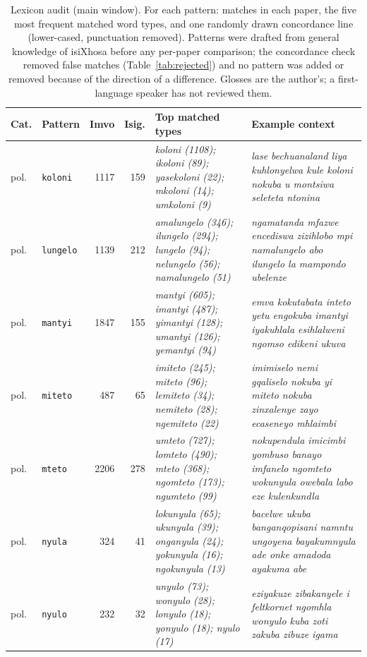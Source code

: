 \begin{table}[h]\centering\scriptsize\caption{Lexicon audit (main window). For each pattern: matches in each paper, the five most frequent matched word types, and one randomly drawn concordance line (lower-cased, punctuation removed). Patterns were drafted from general knowledge of isiXhosa before any per-paper comparison; the concordance check removed false matches (Table~\ref{tab:rejected}) and no pattern was added or removed because of the direction of a difference. Glosses are the author's; a first-language speaker has not reviewed them.}
\begin{tabular}{@{}llrrp{}p{}@{}}\toprule Cat. & Pattern & Imvo & Isig. & Top matched types & Example context \\ \midrule
pol. & \texttt{koloni} & 1117 & 159 & \emph{koloni (1108); ikoloni (89); yasekoloni (22); mkoloni (14); umkoloni (9)} & \emph{lase bechuanaland liya kuhlonyelwa kule koloni nokuba u montsiwa seleteta ntonina} \\
pol. & \texttt{lungelo} & 1139 & 212 & \emph{amalungelo (346); ilungelo (294); lungelo (94); nelungelo (56); namalungelo (51)} & \emph{ngamatanda mfazwe encediswa zizihlobo mpi namalungelo abo ilungelo la mampondo ubelenze} \\
pol. & \texttt{mantyi} & 1847 & 155 & \emph{mantyi (605); imantyi (487); yimantyi (128); umantyi (126); yemantyi (94)} & \emph{emva kokutabata inteto yetu engokuba imantyi iyakuhlala esihlalweni ngomso edikeni ukuva} \\
pol. & \texttt{miteto} & 487 & 65 & \emph{imiteto (245); miteto (96); lemiteto (34); nemiteto (28); ngemiteto (22)} & \emph{imimiselo nemi gqaliselo nokuba yi miteto nokuba zinxalenye zayo ecaseneyo mhlaimbi} \\
pol. & \texttt{mteto} & 2206 & 278 & \emph{umteto (727); lomteto (490); mteto (368); ngomteto (173); ngumteto (99)} & \emph{nokupendula imicimbi yombuso banayo imfanelo ngomteto wokunyula owebala labo eze kulenkundla} \\
pol. & \texttt{nyula} & 324 & 41 & \emph{lokunyula (65); ukunyula (39); onganyula (24); yokunyula (16); ngokunyula (13)} & \emph{bacelwe ukuba banganqopisani namntu ungoyena bayakumnyula ade onke amadoda ayakuma abe} \\
pol. & \texttt{nyulo} & 232 & 32 & \emph{unyulo (73); wonyulo (28); lonyulo (18); yonyulo (18); nyulo (17)} & \emph{eziyakuze zibakanyele i feltkornet ngomhla wonyulo kuba zoti zakuba zibuze igama} \\

\end{tabular}
\end{table}
